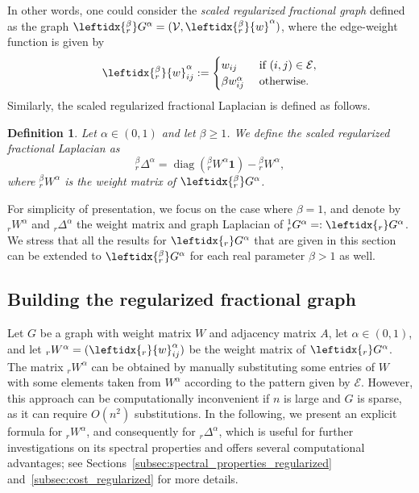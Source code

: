 \documentclass[a4paper,12pt]{article}
\newtheorem{definition}{Definition}
\DeclareMathOperator{\diag}{diag}
\newcommand{\cE}{\mathcal{E}}
\newcommand{\cV}{\mathcal{V}}
\newcommand{\fL}{\Delta^\alpha}
\newcommand{\rfL}{{}_r\fL}
\newcommand{\srfL}{{}_r^\beta\fL}
\newcommand{\fW}{W^\alpha}
\newcommand{\rfW}{{}_r\fW}
\newcommand{\srfW}{{}_r^\beta\fW}
\newcommand{\fG}{G^\alpha}
\newcommand{\rfG}{\leftidx{_r}\fG}
\newcommand{\srfG}{\leftidx{_r^\beta}\fG}
\begin{document}
In other words, one could consider
the \emph{scaled regularized fractional graph} defined as the graph $\srfG = (\cV,\leftidx{_r^\beta}{w}^{\alpha})$, where 
the edge-weight function is given by
\begin{equation*}
\leftidx{_r^\beta}{w}^{\alpha}_{ij}:=
\begin{cases}
    w_{ij}  & \text{ if } (i,j)\in\cE, \\
    \beta w_{ij}^{\alpha} & \text{ otherwise. }\\
\end{cases}
\end{equation*}
Similarly, the scaled regularized fractional Laplacian is defined as follows.
\begin{definition} 
Let $\alpha\in(0,1)$ and let $\beta\geq1$.  We define the \emph{scaled regularized fractional Laplacian} as
     \begin{equation} \label{eq:reg_laplacian_defin}
         \srfL = \diag(\srfW\mathbf{1})-\srfW,
         \end{equation}
         where $\srfW$ is the weight matrix of $\srfG$.
\end{definition}

For simplicity of presentation, we focus on the case where $\beta=1$, and denote by $\rfW$ and $\rfL$ the weight matrix and graph Laplacian of ${}_r^{1}\fG=:\rfG$. We stress that all the results for $\rfG$ that are given in this section can be extended to $\srfG$ for each real parameter $\beta>1$ as well.

\subsection{Building the regularized fractional graph}\label{subsec:building_regularized}
 Let $G$ be a graph with weight matrix $W$ and adjacency matrix $A$, let $\alpha\in(0,1)$, and let $\rfW=(\leftidx{_r}{w}^{\alpha}_{ij})$ be the weight matrix of $\rfG$. The matrix $\rfW$ can be obtained by manually substituting some entries of $W$ with some elements taken from $\fW$ according to the pattern given by $\cE$. However, this approach can be computationally inconvenient if $n$ is large and $G$ is sparse, as it can require $O(n^2)$ substitutions. In the following, we present an explicit formula for $\rfW$, and consequently for $\rfL$, which is useful for further investigations on its spectral properties and offers several computational advantages; see Sections~\ref{subsec:spectral_properties_regularized} and~\ref{subsec:cost_regularized} for more details.
\end{document}
